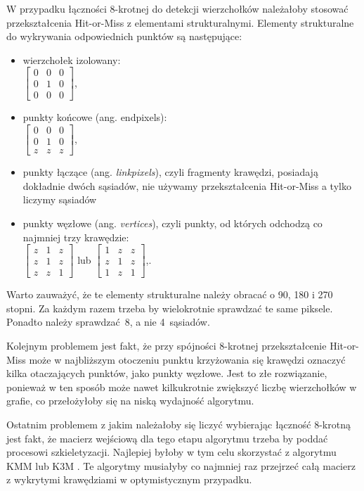 \documentclass[a4paper,11pt,twoside,openright]{report}
\theoremstyle{definition}
\begin{document}
W przypadku łączności 8-krotnej do detekcji wierzchołków należałoby stosować
przekształcenia Hit-or-Miss z elementami strukturalnymi. Elementy strukturalne
do wykrywania odpowiednich punktów są następujące:
\begin{itemize}%
\item wierzchołek izolowany: \\
$
\begin{bmatrix}
0 & 0 & 0 \\
0 & 1 & 0 \\
0 & 0 & 0
\end{bmatrix}
$,
\item punkty końcowe (ang. endpixels): \\
$
\begin{bmatrix}
0 & 0 & 0 \\
0 & 1 & 0 \\
z & z & z
\end{bmatrix}
$,
\item punkty łączące (ang. \textit{linkpixels}), czyli fragmenty krawędzi, posiadają
dokładnie dwóch sąsiadów, nie używamy przekształcenia Hit-or-Miss a tylko liczymy sąsiadów
\item punkty węzłowe (ang. \textit{vertices}), czyli punkty, od których odchodzą co najmniej trzy krawędzie: \\
$
\begin{bmatrix}
z & 1 & z \\
z & 1 & z \\
z & z & 1
\end{bmatrix}
$ lub $
\begin{bmatrix}
1 & z & z \\
z & 1 & z \\
1 & z & 1
\end{bmatrix}
$,.
\end{itemize}

Warto zauważyć, że te elementy strukturalne należy obracać o 90, 180 i 270 stopni.
Za każdym razem trzeba by wielokrotnie sprawdzać te same piksele. Ponadto należy
sprawdzać~8, a nie 4~sąsiadów.

Kolejnym problemem jest fakt, że przy spójności 8-krotnej przekształcenie
Hit-or-Miss może w najbliższym otoczeniu punktu krzyżowania się krawędzi oznaczyć
kilka otaczających punktów, jako punkty węzłowe. Jest to złe rozwiązanie, ponieważ
w ten sposób może nawet kilkukrotnie zwiększyć liczbę wierzchołków w grafie, co
przełożyłoby się na niską wydajność algorytmu.

Ostatnim problemem z jakim należałoby się liczyć wybierając łączność 8-krotną
jest fakt, że macierz wejściową dla tego etapu algorytmu trzeba by poddać procesowi
szkieletyzacji. Najlepiej byłoby w tym celu skorzystać z algorytmu KMM \cite{KMM}
lub K3M \cite{K3M}. Te algorytmy musiałyby co najmniej raz przejrzeć całą macierz
z wykrytymi krawędziami w optymistycznym przypadku.
\end{document}
